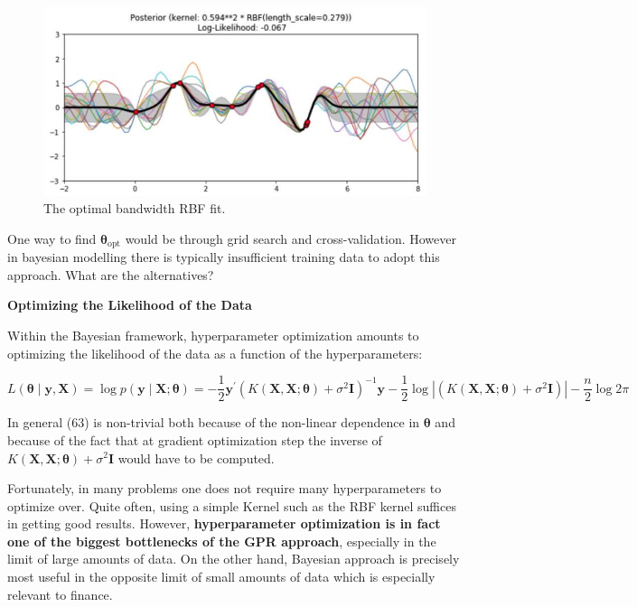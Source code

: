 \documentclass[11pt]{article}
\theoremstyle{plain} %
\theoremstyle{remark}
\begin{document}
\begin{figure}[!htp]
\begin{minipage}{0.33\textwidth}
    \centering
    \includegraphics[width=\textwidth]{images/2023_11_26_5b299dbd302e8f129737g-62}
    \caption{The optimal bandwidth RBF fit.}
    \label{fig:RBF Kernel optimal bandwidth}
  \end{minipage}
\end{figure}

One way to find $\boldsymbol{\theta}_{\text {opt}}$ would be through grid search and
cross-validation. However in bayesian modelling there is typically insufficient
training data to adopt this approach. What are the alternatives?

\textbf{Optimizing the Likelihood of the Data}

Within the Bayesian framework, hyperparameter optimization amounts to optimizing
the likelihood of the data as a function of the hyperparameters:

$$
  L(\boldsymbol{\theta} \mid \mathbf{y}, \mathbf{X}) =\log p(\mathbf{y} \mid \mathbf{X} ; \boldsymbol{\theta})
  =-\frac{1}{2} \mathbf{y}^{\prime}\left(K(\mathbf{X}, \mathbf{X} ; \boldsymbol{\theta})+\sigma^{2} \mathbf{I}\right)^{-1} \mathbf{y} -\frac{1}{2} \log \left|\left(K(\mathbf{X}, \mathbf{X} ; \boldsymbol{\theta})+\sigma^{2} \mathbf{I}\right)\right|-\frac{n}{2} \log 2 \pi
$$

In general (63) is non-trivial both because of the non-linear dependence in
$\boldsymbol{\theta}$ and because of the fact that at gradient optimization step the inverse
of $K(\mathbf{X}, \mathbf{X} ; \boldsymbol{\theta})+\sigma^{2} \mathbf{I}$ would
have to be computed.

Fortunately, in many problems one does not require many hyperparameters to
optimize over. Quite often, using a simple Kernel such as the RBF kernel suffices
in getting good results. However, \textbf{hyperparameter optimization is in fact one of
  the biggest bottlenecks of the GPR approach}, especially in the limit of large
amounts of data. On the other hand, Bayesian approach is precisely most useful
in the opposite limit of small amounts of data which is especially relevant to
finance.
\end{document}
